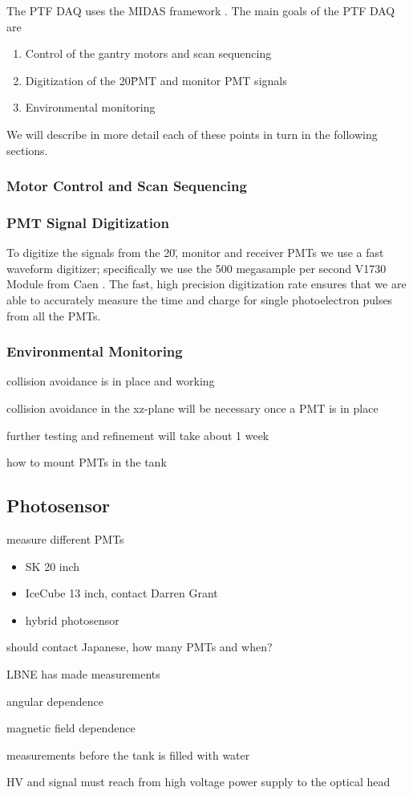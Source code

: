 The PTF DAQ uses the MIDAS framework \cite{MIDASRef}.  The main goals of the PTF DAQ are

\begin{enumerate}
\item Control of the gantry motors and scan sequencing
\item Digitization of the 20\" PMT and monitor PMT signals 
\item Environmental monitoring
\end{enumerate}

We will describe in more detail each of these points in turn in the following sections.

\subsubsection{Motor Control and Scan Sequencing}


\subsubsection{PMT Signal Digitization}

To digitize the signals from the 20\", monitor and receiver PMTs we use a fast waveform digitizer; specifically
we use the 500 megasample per second V1730 Module from Caen \cite{V1730Ref}.  The fast, high precision digitization rate ensures that we
are able to accurately measure the time and charge for single photoelectron pulses from all the PMTs.


\subsubsection{Environmental Monitoring}




collision avoidance is in place and working

collision avoidance in the xz-plane will be necessary once a PMT is in place

further testing and refinement will take about 1 week

how to mount PMTs in the tank




\subsection{Photosensor}

measure different PMTs
\begin{itemize}
\item SK 20 inch
\item IceCube 13 inch, contact Darren Grant
\item hybrid photosensor
\end{itemize}

should contact Japanese, how many PMTs and when?

LBNE has made measurements

angular dependence

magnetic field dependence


measurements before the tank is filled with water

HV and signal must reach from high voltage power supply to the optical
head

